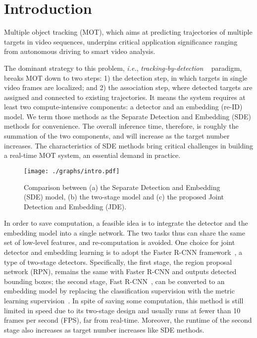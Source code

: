 \documentclass[runningheads]{llncs}
\def\ie{\textit{i.e.}}
\begin{document}
\section{Introduction}
Multiple object tracking (MOT), which aims at predicting trajectories of multiple targets in video sequences, underpins critical application significance ranging from autonomous driving to smart video analysis. 

The dominant strategy to this problem, \ie,  \emph{tracking-by-detection} ~\cite{mot16,poi,nomt} paradigm, breaks MOT down to two steps: 1) the detection step, in which targets in single video frames are localized; and 2) the association step, where detected targets are assigned and connected to existing trajectories. 
It means the system requires at least two compute-intensive components: a detector and an embedding (re-ID) model. We term those methods as the Separate Detection and Embedding (SDE) methods for convenience. The overall inference time, therefore, is roughly the summation of the two components, and will increase as the target number increases. {The characteristics  of SDE methods bring critical challenges in building a real-time MOT system, an essential demand in practice.}
\begin{figure}[t]
    \centering
    \texttt{[image: ./graphs/intro.pdf]}
    \caption{Comparison between (a) the Separate Detection and Embedding (SDE) model, (b) the two-stage model and (c) the proposed Joint Detection and Embedding (JDE).}
    \label{fig:intro}
\end{figure}
    
In order to save computation, a feasible idea is to integrate the detector and the embedding model into a single network. The two tasks thus can share the same set of low-level features, and re-computation is avoided. One choice for joint detector and embedding learning is to adopt the Faster R-CNN framework~\cite{faster}, a type of two-stage detectors. Specifically, the first stage, the region proposal network (RPN), remains the same with Faster R-CNN and outputs detected bounding boxes; the second stage, Fast R-CNN~\cite{fast}, can be converted to an embedding model by replacing the classification supervision with the metric learning supervision~\cite{personsearch,MOTS}. In spite of saving some computation, this method is still limited in speed due to its two-stage design and usually runs at fewer than 10 frames per second (FPS), far from real-time. Moreover, the runtime of the second stage also increases as target number increases like SDE methods.
\end{document}
